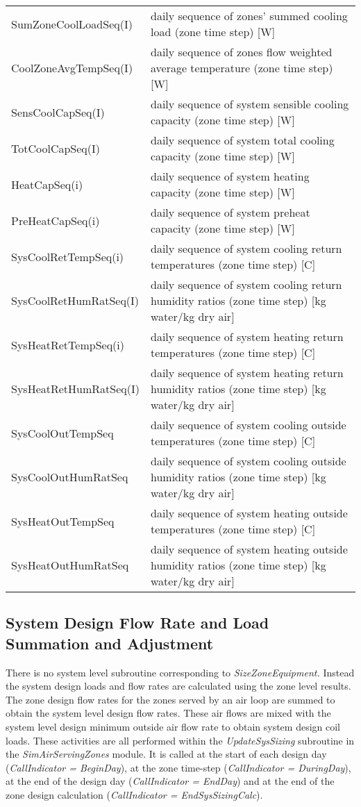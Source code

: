 \begin{longtable}[c]{p{2.0in}p{4.0in}}
SumZoneCoolLoadSeq(I) & daily sequence of zones' summed cooling load (zone time step) [W] \tabularnewline
CoolZoneAvgTempSeq(I) & daily sequence of zones flow weighted average temperature (zone time step) [W] \tabularnewline
SensCoolCapSeq(I) & daily sequence of system sensible cooling capacity (zone time step) [W] \tabularnewline
TotCoolCapSeq(I) & daily sequence of system total cooling capacity (zone time step) [W] \tabularnewline
HeatCapSeq(i) & daily sequence of system heating capacity (zone time step) [W] \tabularnewline
PreHeatCapSeq(i) & daily sequence of system preheat capacity (zone time step) [W] \tabularnewline
SysCoolRetTempSeq(i) & daily sequence of system cooling return temperatures (zone time step) [C] \tabularnewline
SysCoolRetHumRatSeq(I) & daily sequence of system cooling return humidity ratios (zone time step) [kg water/kg dry air] \tabularnewline
SysHeatRetTempSeq(i) & daily sequence of system heating return temperatures (zone time step) [C] \tabularnewline
SysHeatRetHumRatSeq(I) & daily sequence of system heating return humidity ratios (zone time step) [kg water/kg dry air] \tabularnewline
SysCoolOutTempSeq & daily sequence of system cooling outside temperatures (zone time step) [C] \tabularnewline
SysCoolOutHumRatSeq & daily sequence of system cooling outside humidity ratios (zone time step) [kg water/kg dry air] \tabularnewline
SysHeatOutTempSeq & daily sequence of system heating outside temperatures (zone time step) [C] \tabularnewline
SysHeatOutHumRatSeq & daily sequence of system heating outside humidity ratios (zone time step) [kg water/kg dry air] \tabularnewline
\bottomrule
\end{longtable}

\subsection{System Design Flow Rate and Load Summation and Adjustment}\label{system-design-flow-rate-and-load-summation-and-adjustment}

There is no system level subroutine corresponding to \emph{SizeZoneEquipment.} Instead the system design loads and flow rates are calculated using the zone level results. The zone design flow rates for the zones served by an air loop are summed to obtain the system level design flow rates. These air flows are mixed with the system level design minimum outside air flow rate to obtain system design coil loads. These activities are all performed within the \emph{UpdateSysSizing} subroutine in the \emph{SimAirServingZones} module. It is called at the start of each design day (\emph{CallIndicator = BeginDay}), at the zone time-step (\emph{CallIndicator = DuringDay}), at the end of the design day (\emph{CallIndicator = EndDay}) and at the end of the zone design calculation (\emph{CallIndicator = EndSysSizingCalc}).

